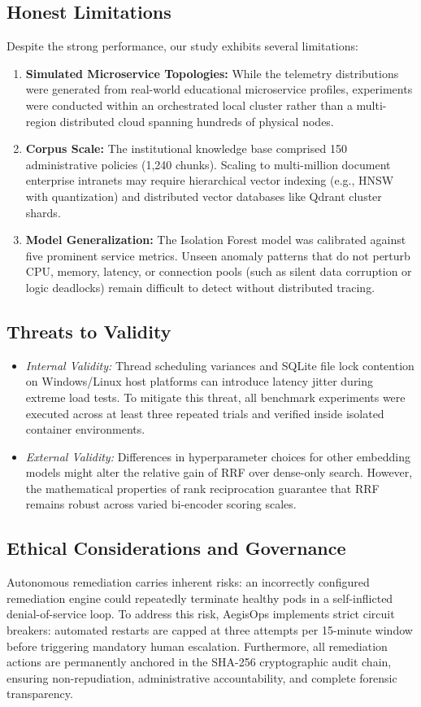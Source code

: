 \documentclass[12pt,onecolumn,draftclsnofoot]{IEEEtran}
\begin{document}
\subsection{Honest Limitations}
Despite the strong performance, our study exhibits several limitations:
\begin{enumerate}
    \item \textbf{Simulated Microservice Topologies:} While the telemetry distributions were generated from real-world educational microservice profiles, experiments were conducted within an orchestrated local cluster rather than a multi-region distributed cloud spanning hundreds of physical nodes.
    \item \textbf{Corpus Scale:} The institutional knowledge base comprised 150 administrative policies (1,240 chunks). Scaling to multi-million document enterprise intranets may require hierarchical vector indexing (e.g., HNSW with quantization) and distributed vector databases like Qdrant cluster shards.
    \item \textbf{Model Generalization:} The Isolation Forest model was calibrated against five prominent service metrics. Unseen anomaly patterns that do not perturb CPU, memory, latency, or connection pools (such as silent data corruption or logic deadlocks) remain difficult to detect without distributed tracing.
\end{enumerate}

\subsection{Threats to Validity}
\begin{itemize}
    \item \emph{Internal Validity:} Thread scheduling variances and SQLite file lock contention on Windows/Linux host platforms can introduce latency jitter during extreme load tests. To mitigate this threat, all benchmark experiments were executed across at least three repeated trials and verified inside isolated container environments.
    \item \emph{External Validity:} Differences in hyperparameter choices for other embedding models might alter the relative gain of RRF over dense-only search. However, the mathematical properties of rank reciprocation guarantee that RRF remains robust across varied bi-encoder scoring scales.
\end{itemize}

\subsection{Ethical Considerations and Governance}
Autonomous remediation carries inherent risks: an incorrectly configured remediation engine could repeatedly terminate healthy pods in a self-inflicted denial-of-service loop. To address this risk, AegisOps implements strict circuit breakers: automated restarts are capped at three attempts per 15-minute window before triggering mandatory human escalation. Furthermore, all remediation actions are permanently anchored in the SHA-256 cryptographic audit chain, ensuring non-repudiation, administrative accountability, and complete forensic transparency.
\end{document}
